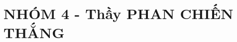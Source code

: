\documentclass[12pt,a4paper,oneside]{book}
\begin{document}
\chapter{NHÓM 4 - Thầy PHAN CHIẾN THẮNG}

\newpage
\newpage
\newpage
\newpage
\newpage
\newpage
\newpage
\newpage
\newpage
\newpage
\newpage
\newpage
\newpage
\end{document}

